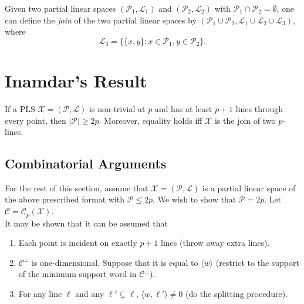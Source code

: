 \documentclass{article}
\begin{document}
	\begin{fdef}[Join]
		Given two partial linear spaces $(\mathcal{P}_1,\mathcal{L}_1)$ and $(\mathcal{P}_2,\mathcal{L}_2)$ with $\mathcal{P}_1 \cap \mathcal{P}_2 = \emptyset$, one can define the \emph{join} of the two partial linear spaces by $(\mathcal{P}_1 \cup \mathcal{P}_2, \mathcal{L}_1\cup\mathcal{L}_2\cup\mathcal{L}_3)$, where
		\[ \mathcal{L}_3 = \{ \{x,y\} : x \in \mathcal{P}_1, y \in \mathcal{P}_2 \}. \]
	\end{fdef}

\section{Inamdar's Result}



	\begin{ftheo}
		If a PLS $\mathcal{X} = (\mathcal{P},\mathcal{L})$ is non-trivial at $p$ and has at least $p+1$ lines through every point, then $|\mathcal{P}| \ge 2p$. Moreover, equality holds iff $\mathcal{X}$ is the join of two $p$-lines.
	\end{ftheo}

	\subsection{Combinatorial Arguments}

		For the rest of this section, assume that $\mathcal{X} = (\mathcal{P},\mathcal{L})$ is a partial linear space of the above prescribed format with $\mathcal{P} \le 2p$. We wish to show that $\mathcal{P} = 2p$. Let $\mathcal{C} = \mathcal{C}_p(\mathcal{X})$. \\
		It may be shown that it can be assumed that 
		\begin{enumerate}
			\item Each point is incident on exactly $p+1$ lines (throw away extra lines).
			\item $\mathcal{C}^\perp$ is one-dimensional. Suppose that it is equal to $\langle w \rangle$ (restrict to the support of the minimum support word in $\mathcal{C}^\perp$).
			\item For any line $\ell$ and any $\ell' \subsetneq \ell$, $\langle w,\ell'\rangle \ne 0$ (do the splitting procedure).
		\end{enumerate}
		
\end{document}
